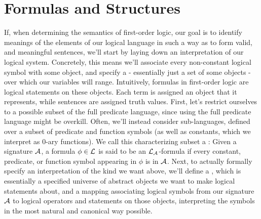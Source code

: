 \documentclass{article}
\begin{document}
\section{Formulas and Structures}
If, when determining the semantics of first-order logic, our goal is to identify meanings of the elements of our logical language in such a way as to form valid, and meaningful sentences, we'll start by laying down an interpretation of our logical system. Concretely, this means we'll associate every non-constant logical symbol with some object, and specify a  - essentially just a set of some objects - over which our variables will range. Intuitively, formulas in first-order logic are logical statements on these objects. Each term is assigned an object that it represents, while sentences are assigned truth values.
\nn
First, let's restrict ourselves to a possible subset of the full predicate language, since using the full predicate language might be overkill. Often, we'll instead consider sub-languages, defined over a subset of predicate and function symbols (as well as constants, which we interpret as 0-ary functions). We call this characterizing subset a :
Given a signature $ \mathcal{A} $, a formula $ \phi \in \mathcal{L} $ is said to be an $ \mathcal{L}_{\mathcal{A}} $-formula if every constant, predicate, or function symbol appearing in $ \phi $ is in $ \mathcal{A} $. Next, to actually formally specify an interpretation of the kind we want above, we'll define a , which is essentially a specified universe of abstract objects we want to make logical statements about, and a mapping associating logical symbols from our signature $ \mathcal{A} $ to logical operators and statements on those objects, interpreting the symbols in the most natural and canonical way possible.
\end{document}

